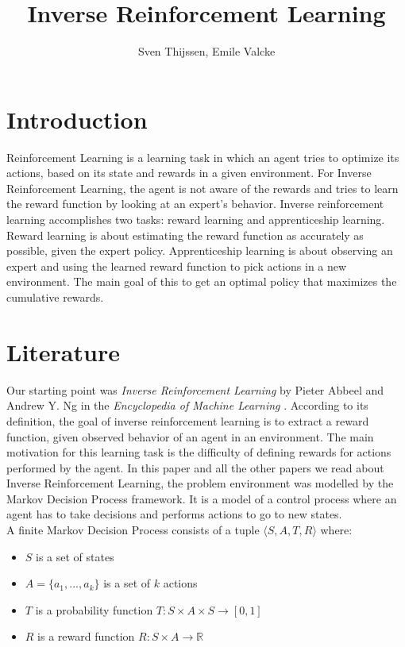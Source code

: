 \documentclass[10pt,a4paper,twocolumn]{article}
\author{Sven Thijssen, Emile Valcke}
\title{Inverse Reinforcement Learning}
\begin{document}
\maketitle

\section{Introduction}
Reinforcement Learning is a learning task in which an agent tries to optimize its actions, based on its state and rewards in a given environment. For Inverse Reinforcement Learning, the agent is not aware of the rewards and tries to learn the reward function by looking at an expert's behavior. Inverse reinforcement learning accomplishes two tasks: reward learning and apprenticeship learning. Reward learning is about estimating the reward function as accurately as possible, given the expert policy. Apprenticeship learning is about observing an expert and using the learned reward function to pick actions in a new environment. The main goal of this to get an optimal policy that maximizes the cumulative rewards.

\section{Literature}
Our starting point was \textit{Inverse Reinforcement Learning} by Pieter Abbeel and Andrew Y. Ng in the \textit{Encyclopedia of Machine Learning} \cite{sammut2011encyclopedia}. According to its definition, the goal of inverse reinforcement learning is to extract a reward function, given observed behavior of an agent in an environment. The main motivation for this learning task is the difficulty of defining rewards for actions performed by the agent. In this paper and all the other papers we read about Inverse Reinforcement Learning, the problem environment was modelled by the Markov Decision Process framework. It is a model of a control process where an agent has to take decisions and performs actions to go to new states.\\

A finite Markov Decision Process consists of a tuple $\langle S,A,T,R \rangle$ where:

\begin{itemize}
\item $S$ is a set of states
\item $A = \{a_1,...,a_k\}$ is a set of $k$ actions
\item $T$ is a probability function $T: S \times A \times S \to [0,1]$
\item $R$ is a reward function $R: S \times A \to \mathbb{R}$
\end{itemize}
\end{document}
